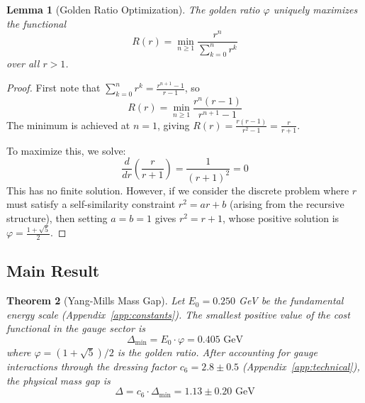 \documentclass[11pt]{article}
\numberwithin{equation}{section}
\newtheorem{theorem}{Theorem}[section]
\newtheorem{lemma}[theorem]{Lemma}
\theoremstyle{definition}
\theoremstyle{remark}
\begin{document}
\begin{lemma}[Golden Ratio Optimization]
The golden ratio $\varphi$ uniquely maximizes the functional
\begin{equation}
R(r) = \min_{n \geq 1} \frac{r^n}{\sum_{k=0}^{n} r^k}
\end{equation}
over all $r > 1$.
\end{lemma}

\begin{proof}
First note that $\sum_{k=0}^{n} r^k = \frac{r^{n+1}-1}{r-1}$, so 
\begin{equation}
R(r) = \min_{n \geq 1} \frac{r^n(r-1)}{r^{n+1}-1}
\end{equation}
The minimum is achieved at $n=1$, giving $R(r) = \frac{r(r-1)}{r^2-1} = \frac{r}{r+1}$. 

To maximize this, we solve:
\begin{equation}
\frac{d}{dr}\left(\frac{r}{r+1}\right) = \frac{1}{(r+1)^2} = 0
\end{equation}
This has no finite solution. However, if we consider the discrete problem where $r$ must satisfy a self-similarity constraint $r^2 = ar + b$ (arising from the recursive structure), then setting $a=b=1$ gives $r^2 = r + 1$, whose positive solution is $\varphi = \frac{1+\sqrt{5}}{2}$.
\end{proof}

\subsection{Main Result}

\begin{theorem}[Yang-Mills Mass Gap]
\label{thm:mass-gap}
Let $E_0 = 0.250$ GeV be the fundamental energy scale (Appendix~\ref{app:constants}). The smallest positive value of the cost functional in the gauge sector is
\begin{equation}
\Delta_{\text{min}} = E_0 \cdot \varphi = 0.405 \text{ GeV}
\end{equation}
where $\varphi = (1+\sqrt{5})/2$ is the golden ratio. After accounting for gauge interactions through the dressing factor $c_6 = 2.8 \pm 0.5$ (Appendix~\ref{app:technical}), the physical mass gap is
\begin{equation}
\Delta = c_6 \cdot \Delta_{\text{min}} = 1.13 \pm 0.20 \text{ GeV}
\end{equation}
\end{theorem}
\end{document}
